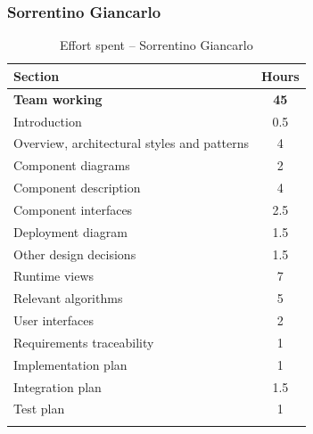 \documentclass[a4paper,oneside,11pt]{book}
\begin{document}
    \subsubsection{Sorrentino Giancarlo}
    \begin{longtable}[c]{|H{.55\textwidth}|c|}
        \hline
        \textbf{Section} & {\bfseries{Hours}} \\ \hline
        \textbf{Team working} & \textbf{45} \\ \hline
        Introduction                                  & 0.5 \\ \hline
        Overview, architectural styles and patterns   & 4 \\ \hline
        Component diagrams                            & 2 \\ \hline
        Component description                         & 4 \\ \hline
        Component interfaces                          & 2.5 \\ \hline
        Deployment diagram                            & 1.5 \\ \hline
        Other design decisions                        & 1.5 \\ \hline
        Runtime views                                 & 7 \\ \hline
        Relevant algorithms                           & 5 \\ \hline
        User interfaces                               & 2 \\ \hline
        Requirements traceability                     & 1 \\ \hline
        Implementation plan                           & 1 \\ \hline
        Integration plan                              & 1.5 \\ \hline 
        Test plan                                     & 1 \\ \hline
        \caption{Effort spent -- Sorrentino Giancarlo}
        \label{table:effort_sorrentino}
    \end{longtable}
    
    \newpage
\end{document}

